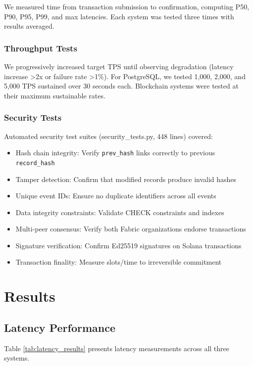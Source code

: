\documentclass[conference]{IEEEtran}
\begin{document}
We measured time from transaction submission to confirmation, computing P50, P90, P95, P99, and max latencies. Each system was tested three times with results averaged.

\subsubsection{Throughput Tests}
We progressively increased target TPS until observing degradation (latency increase >2x or failure rate >1\%). For PostgreSQL, we tested 1,000, 2,000, and 5,000 TPS sustained over 30 seconds each. Blockchain systems were tested at their maximum sustainable rates.

\subsubsection{Security Tests}
Automated security test suites (security\_tests.py, 448 lines) covered:
\begin{itemize}
\item Hash chain integrity: Verify \texttt{prev\_hash} links correctly to previous \texttt{record\_hash}
\item Tamper detection: Confirm that modified records produce invalid hashes
\item Unique event IDs: Ensure no duplicate identifiers across all events
\item Data integrity constraints: Validate CHECK constraints and indexes
\item Multi-peer consensus: Verify both Fabric organizations endorse transactions
\item Signature verification: Confirm Ed25519 signatures on Solana transactions
\item Transaction finality: Measure slots/time to irreversible commitment
\end{itemize}

\section{Results}
\label{sec:results}

\subsection{Latency Performance}

Table \ref{tab:latency_results} presents latency measurements across all three systems.
\end{document}
